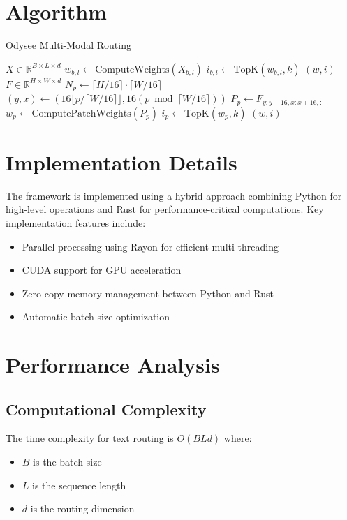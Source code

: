 \documentclass[10pt,journal,compsoc]{IEEEtran}
\begin{document}
\section{Algorithm}
\begin{algorithm}
\caption{Odysee Multi-Modal Routing}
\begin{algorithmic}[1]
    \State $X \in \mathbb{R}^{B \times L \times d}$ 
            \State $w_{b,l} \gets \text{ComputeWeights}(X_{b,l})$
            \State $i_{b,l} \gets \text{TopK}(w_{b,l}, k)$
        \EndFor
    \EndFor
    \Return $(w, i)$
\EndProcedure
{}
    \State $F \in \mathbb{R}^{H \times W \times d}$ 
    \State $N_p \gets \lceil H/16 \rceil \cdot \lceil W/16 \rceil$
        \State $(y, x) \gets (16\lfloor p/\lceil W/16 \rceil\rfloor, 16(p \bmod \lceil W/16 \rceil))$
        \State $P_p \gets F_{y:y+16, x:x+16, :}$ 
        \State $w_p \gets \text{ComputePatchWeights}(P_p)$
        \State $i_p \gets \text{TopK}(w_p, k)$
    \EndFor
    \Return $(w, i)$
\EndProcedure
\end{algorithmic}
\end{algorithm}

\section{Implementation Details}
The framework is implemented using a hybrid approach combining Python for high-level operations and Rust for performance-critical computations. Key implementation features include:

\begin{itemize}
    \item Parallel processing using Rayon for efficient multi-threading
    \item CUDA support for GPU acceleration
    \item Zero-copy memory management between Python and Rust
    \item Automatic batch size optimization
\end{itemize}

\section{Performance Analysis}
\subsection{Computational Complexity}
The time complexity for text routing is $O(BLd)$ where:
\begin{itemize}
    \item $B$ is the batch size
    \item $L$ is the sequence length
    \item $d$ is the routing dimension
\end{itemize}
\end{document}
